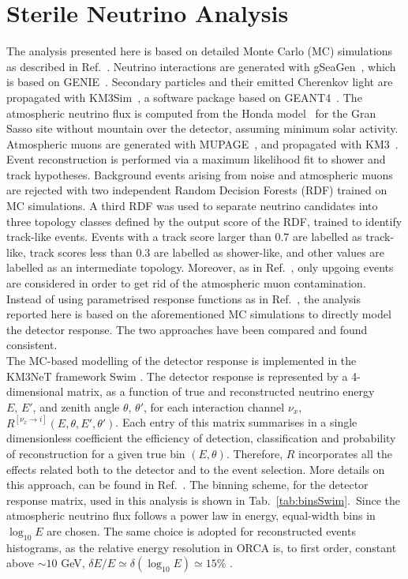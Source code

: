 \section{Sterile Neutrino Analysis}\label{sec:analysismethod}
The analysis presented here is based on detailed Monte Carlo (MC) simulations as described in Ref.~\cite{ORCA_NMO_Paper}. Neutrino interactions are generated with gSeaGen~\cite{gSeaGen}, which is based on GENIE~\cite{GENIE}. Secondary particles and their emitted Cherenkov light are propagated with KM3Sim~\cite{KM3Sim}, a software package based on GEANT4~\cite{GEANT4}. The atmospheric neutrino flux is computed from the Honda model~\cite{Honda} for the Gran Sasso site without mountain over the detector, assuming minimum solar activity. Atmospheric muons are generated with MUPAGE~\cite{MUPAGE, MUPAGE2}, and propagated with KM3~\cite{KM3}.
\\
Event reconstruction is performed via a maximum likelihood fit to shower and track hypotheses. Background events arising from noise and atmospheric muons are rejected with two independent Random Decision Forests (RDF) trained on MC simulations. A third RDF was used to separate neutrino candidates into three topology classes defined by the output score of the RDF, trained to identify track-like events. Events with a track score larger than 0.7 are labelled as track-like, track scores less than 0.3 are labelled as shower-like, and other values are labelled as an intermediate topology. Moreover, as in Ref.~\cite{ORCA_NMO_Paper}, only upgoing events are considered in order to get rid of the atmospheric muon contamination.
\\
Instead of using parametrised response functions as in Ref.~\cite{ORCA_NMO_Paper}, the analysis reported here is based on the aforementioned MC simulations to directly model the detector response. The two approaches have been compared and found consistent.
\\
The MC-based modelling of the detector response is implemented in the KM3NeT framework Swim \cite{swim}. The detector response is represented by a 4-dimensional matrix, as a function of  true and reconstructed neutrino energy $E, \, E'$, and zenith angle $\theta, \, \theta'$, for each interaction channel $\nu_x$, $R^{[\nu_x \rightarrow i]}(E, \theta, E', \theta')$. Each entry of this matrix summarises in a single dimensionless coefficient the efficiency of detection, classification and probability of reconstruction for a given true bin $(E,\theta)$. Therefore, $R$ incorporates all the effects related both to the detector and to the event selection. More details on this approach, can be found in Ref.~\cite{swim}. The binning scheme, for the detector response matrix, used in this analysis is shown in Tab.\ \ref{tab:binsSwim}.\ Since the atmospheric neutrino flux follows a power law in energy, equal-width bins in $\log_{10}E$ are chosen. The same choice is adopted for reconstructed events histograms, as the relative energy resolution in ORCA is, to first order, constant above $\sim 10$ GeV, $\delta E / E \simeq \delta(\log_{10} E) \simeq 15\%$ \cite{intrinsic_limits}. 
